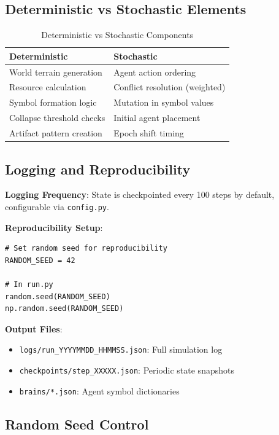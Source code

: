 \documentclass[11pt,a4paper]{article}
\begin{document}
\subsection{Deterministic vs Stochastic Elements}

\begin{table}[htbp]
\centering
\caption{Deterministic vs Stochastic Components}
\label{tab:determinism}
\begin{tabular}{@{}ll@{}}
\toprule
\textbf{Deterministic} & \textbf{Stochastic} \\
\midrule
World terrain generation & Agent action ordering \\
Resource calculation & Conflict resolution (weighted) \\
Symbol formation logic & Mutation in symbol values \\
Collapse threshold checks & Initial agent placement \\
Artifact pattern creation & Epoch shift timing \\
\bottomrule
\end{tabular}
\end{table}

\subsection{Logging and Reproducibility}

\textbf{Logging Frequency}: State is checkpointed every 100 steps by default, configurable via \texttt{config.py}.

\textbf{Reproducibility Setup}:
\begin{verbatim}
# Set random seed for reproducibility
RANDOM_SEED = 42

# In run.py
random.seed(RANDOM_SEED)
np.random.seed(RANDOM_SEED)
\end{verbatim}

\textbf{Output Files}:
\begin{itemize}
    \item \texttt{logs/run\_YYYYMMDD\_HHMMSS.json}: Full simulation log
    \item \texttt{checkpoints/step\_XXXXX.json}: Periodic state snapshots
    \item \texttt{brains/*.json}: Agent symbol dictionaries
\end{itemize}

\subsection{Random Seed Control}
\end{document}
